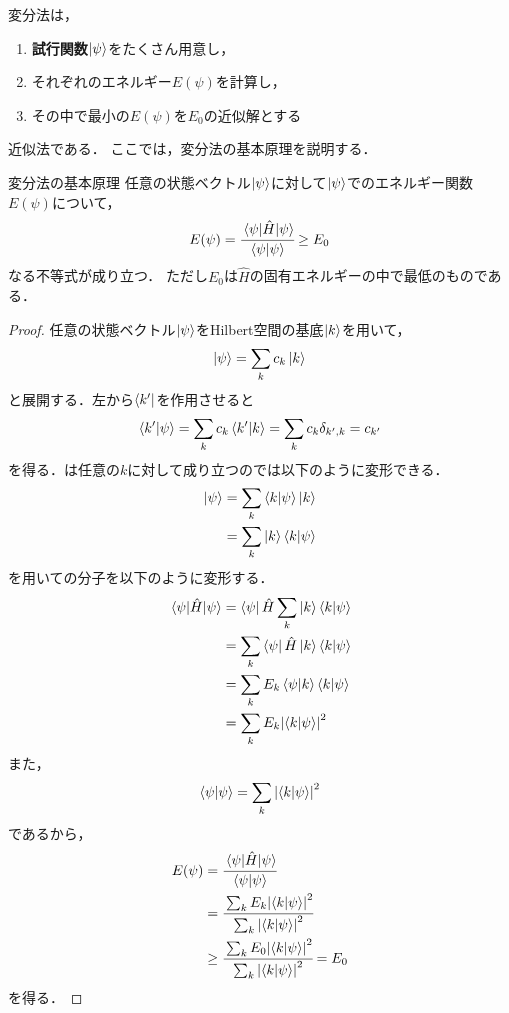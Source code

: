 \documentclass{report}
\begin{document}
  変分法は，
  \begin{screen}
    \begin{enumerate}
      \item \textbf{試行関数}$\ket{\psi}$をたくさん用意し，
      \item それぞれのエネルギー$E(\psi)$を計算し，
      \item その中で最小の$E(\psi)$を$E_0$の近似解とする
    \end{enumerate}
  \end{screen}
  近似法である．
  ここでは，変分法の基本原理を説明する．
  \begin{itembox}[l]{変分法の基本原理}
    任意の状態ベクトル$\ket{\psi}$に対して$\ket{\psi}$でのエネルギー関数$E(\psi)$について，
    \begin{align}
      E(\psi) = \cfrac{\mel{\psi}{\hat{H}}{\psi}}{\braket{\psi}} \geq E_0 \label{minimum}
    \end{align}
    なる不等式が成り立つ．
    ただし$E_0$は$\hat{H}$の固有エネルギーの中で最低のものである．
  \end{itembox}
  \begin{proof}
    任意の状態ベクトル$\ket{\psi}$をHilbert空間の基底$\ket{k}$を用いて，
    \begin{align}
      \ket{\psi} = \sum_{k} c_k\ket{k} \label{basis_expansion}
    \end{align}
    と展開する．左から$\bra{k'}$を作用させると
    \begin{align}
      \braket{k'}{\psi} = \sum_{k}c_k\bra{k'}\ket{k} = \sum_{k}c_k\delta_{k',k} = c_{k'} \label{basis_expansion2}
    \end{align}
    を得る．は任意の$k$に対して成り立つのでは以下のように変形できる．
    \begin{align}
      \ket{\psi} &= \sum_{k}\braket{k}{\psi}\ket{k}\\
      &= \sum_{k}\ket{k}\bra{k}\ket{\psi} \label{basis_expansion3}
    \end{align}
    を用いての分子を以下のように変形する．
    \begin{align}
      \mel{\psi}{\hat{H}}{{\psi}} &= \bra{\psi}\hat{H}\sum_{k}\ket{k}\braket{k}{\psi}\\
      &= \sum_{k}\bra{\psi}\hat{H}\ket{k}\braket{k}{\psi} \\
      &= \sum_{k}E_k\bra{\psi}\ket{k}\braket{k}{\psi} \\
      &= \sum_{k}E_k\abs{\braket{k}{\psi}}^2
    \end{align}
    また，
    \begin{align}
      \braket{\psi}{\psi}=\sum_{k}\abs{\braket{k}{\psi}}^2
    \end{align}
    であるから，
    \begin{align}
      E(\psi) &= \cfrac{\mel{\psi}{\hat{H}}{\psi}}{\braket{\psi}{\psi} } \\ 
      &= \cfrac{\sum_{k}E_k\abs{\braket{k}{\psi}}^2}{\sum_{k}\abs{\braket{k}{\psi}}^2} \\ 
      &\geq \cfrac{\sum_{k}E_0\abs{\braket{k}{\psi}}^2}{\sum_{k}\abs{\braket{k}{\psi}}^2} = E_0
    \end{align}
    を得る．
  \end{proof}
\end{document}
